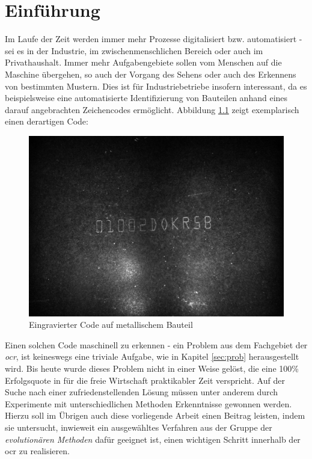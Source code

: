 \chapter{Einführung}
\label{sec:intro}
	
	Im Laufe der Zeit werden immer mehr Prozesse digitalisiert bzw. 
	automatisiert - sei es in der Industrie, im zwischenmenschlichen 
	Bereich oder auch im Privathaushalt. Immer mehr Aufgabengebiete sollen vom 
	Menschen auf die Maschine übergehen, so auch der Vorgang des Sehens oder 
	auch des Erkennens von bestimmten Mustern. Dies ist für Industriebetriebe 
	insofern interessant, da es beispielsweise eine automatisierte 
	Identifizierung von Bauteilen anhand eines darauf angebrachten 
	Zeichencodes ermöglicht. Abbildung \ref{fig:example-code} zeigt 
	exemplarisch einen derartigen Code:
	\begin{figure}[h]
		\centering
		\includegraphics[width=\linewidth]{beispielcode}
		\caption{Eingravierter Code auf metallischem Bauteil}
		\label{fig:example-code}
	\end{figure}

	Einen solchen Code maschinell zu erkennen - ein Problem aus dem Fachgebiet 
	der \textit{\gls{ocr}}, ist keineswegs eine 
	triviale Aufgabe, wie in Kapitel \ref{sec:prob} herausgestellt wird. Bis 
	heute wurde dieses Problem nicht in einer Weise gelöst, die eine 100\% 
	Erfolgsquote in für die freie Wirtschaft praktikabler Zeit verspricht. Auf 
	der Suche nach einer zufriedenstellenden Lösung müssen unter anderem durch 
	Experimente mit unterschiedlichen Methoden Erkenntnisse gewonnen werden. 
	Hierzu soll im Übrigen auch diese vorliegende Arbeit einen Beitrag leisten, 
	indem sie untersucht, inwieweit ein ausgewähltes Verfahren aus der Gruppe 
	der \textit{evolutionären Methoden} dafür geeignet ist, einen wichtigen 
	Schritt innerhalb der \gls{ocr} zu realisieren. \\
	
